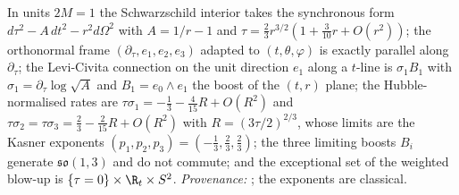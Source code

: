 In units $2M = 1$ the Schwarzschild interior takes the synchronous form $d\tau^2 - A\,dt^2 - r^2 d\Omega^2$ with $A = 1/r - 1$ and $\tau = \tfrac23 r^{3/2}(1 + \tfrac{3}{10}r + O(r^2))$; the orthonormal frame $(\partial_\tau, e_1, e_2, e_3)$ adapted to $(t, \theta, \varphi)$ is exactly parallel along $\partial_\tau$; the Levi-Civita connection on the unit direction $e_1$ along a $t$-line is $\sigma_1 B_1$ with $\sigma_1 = \partial_\tau \log\sqrt{A}$ and $B_1 = e_0 \wedge e_1$ the boost of the $(t, r)$ plane; the Hubble-normalised rates are $\tau\sigma_1 = -\tfrac13 - \tfrac{4}{15}R + O(R^2)$ and $\tau\sigma_2 = \tau\sigma_3 = \tfrac23 - \tfrac{2}{15}R + O(R^2)$ with $R = (3\tau/2)^{2/3}$, whose limits are the Kasner exponents $(p_1, p_2, p_3) = (-\tfrac13, \tfrac23, \tfrac23)$; the three limiting boosts $B_i$ generate $\mathfrak{so}(1,3)$ and do not commute; and the exceptional set of the weighted blow-up is $\{\tau = 0\} \times \R_t \times S^2$. \emph{Provenance:} \cite[Lemmas 5.1 to 5.3, Def.~5.5, Thm.~5.6]{ButlerT6}; the exponents are classical.
